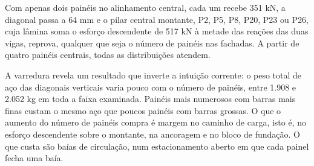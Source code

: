 
Com apenas dois painéis no alinhamento central, cada um recebe 351 kN, a diagonal
passa a 64 mm e o pilar central montante, P2, P5, P8, P20, P23 ou P26, cuja lâmina
soma o esforço descendente de 517 kN à metade das reações das duas vigas, reprova,
qualquer que seja o número de painéis nas fachadas. A partir de quatro painéis centrais,
todas as distribuições atendem.

A varredura revela um resultado que inverte a intuição corrente: o peso total de
aço das diagonais verticais varia pouco com o número de painéis, entre 1.908 e
2.052 kg em toda a faixa examinada. Painéis mais numerosos com
barras mais finas custam o mesmo aço que poucos painéis com barras grossas. O que
o aumento do número de painéis compra é margem no caminho de carga, isto é, no
esforço descendente sobre o montante, na ancoragem e no bloco de fundação. O que
custa são baías de circulação, num estacionamento aberto em que cada painel
fecha uma baía.

